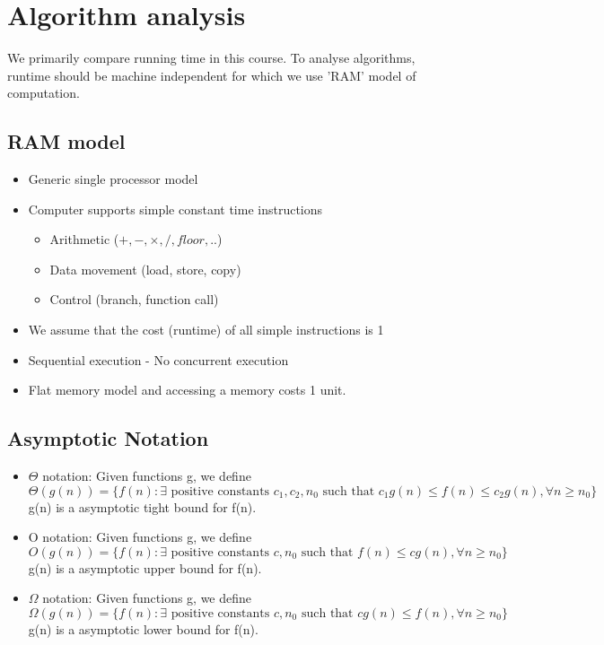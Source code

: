 \documentclass{article}
\begin{document}
\section{Algorithm analysis}
	We primarily compare running time in this course. To analyse algorithms, runtime should be machine independent for which we use 'RAM' model of computation.
	\subsection{RAM model}
	\begin{itemize}
		\item Generic single processor model
		\item Computer supports simple constant time instructions
		\begin{itemize}
			\item Arithmetic ($+,-,\times,/,floor,..$)
			\item Data movement (load, store, copy)
			\item Control (branch, function call)
		\end{itemize}
		\item We assume that the cost (runtime) of all simple instructions is 1
		\item Sequential execution - No concurrent execution
		\item Flat memory model and accessing a memory costs 1 unit.
	\end{itemize}
	\subsection{Asymptotic Notation}
	\begin{itemize}
		\item $\Theta$ notation: Given functions g, we define
		\[\Theta(g(n)) = \{f(n) : \exists \text{ positive constants } c_1,c_2,n_0 \text{ such that } c_1g(n) \leq f(n) \leq c_2g(n), \forall n\geq n_0 \}\]
		g(n) is a asymptotic tight bound for f(n).
		\item O notation: Given functions g, we define
		\[O(g(n)) = \{f(n) : \exists\text{ positive constants }c,n_0 \text{ 	such that }  f(n)\leq cg(n), \forall n\geq n_0 \}\]
		g(n) is a asymptotic upper bound for f(n).
		\item $\Omega$ notation: Given functions g, we define
		\[\Omega(g(n)) = \{f(n) : \exists\text{ positive constants }c,n_0 \text{ such that } cg(n)\leq f(n), \forall n\geq n_0\} \]
		g(n) is a asymptotic lower bound for f(n).
	\end{itemize}
\end{document}
